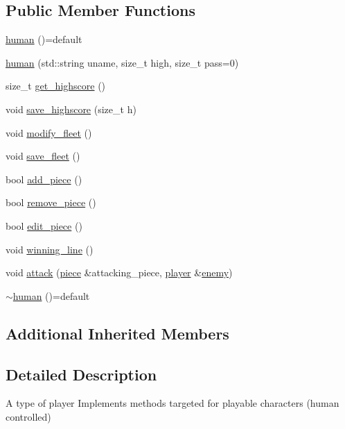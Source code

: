 \subsection*{Public Member Functions}
\begin{DoxyCompactItemize}
\item 
\hyperlink{classbattle__ship_1_1human_abf9adbf70e2b5cec288c900f337f4c56}{human} ()=default
\item 
\hyperlink{classbattle__ship_1_1human_a9d8abd36c22aeddad8c57a5b1e74b4cd}{human} (std\+::string uname, size\+\_\+t high, size\+\_\+t pass=0)
\item 
size\+\_\+t \hyperlink{classbattle__ship_1_1human_ac3529c252376938ce6b62ac40f8df3b3}{get\+\_\+highscore} ()
\item 
void \hyperlink{classbattle__ship_1_1human_a5b7e6cad4d1f187907a205b767a2fd7d}{save\+\_\+highscore} (size\+\_\+t h)
\item 
void \hyperlink{classbattle__ship_1_1human_ab6e8f18828d7671bbc7645f38369d370}{modify\+\_\+fleet} ()
\item 
void \hyperlink{classbattle__ship_1_1human_a3d14bca9009f7cfb8d4501d428524416}{save\+\_\+fleet} ()
\item 
bool \hyperlink{classbattle__ship_1_1human_adaea883b2eb5fa5932a9d7239c90bfd6}{add\+\_\+piece} ()
\item 
bool \hyperlink{classbattle__ship_1_1human_a2638497165f4a593b3b597a785fc3ee0}{remove\+\_\+piece} ()
\item 
bool \hyperlink{classbattle__ship_1_1human_a8f0addc975b597a92d4c82849c2fff5d}{edit\+\_\+piece} ()
\item 
void \hyperlink{classbattle__ship_1_1human_a583d0a9dd05c16f700d0d1825916faa3}{winning\+\_\+line} ()
\item 
void \hyperlink{classbattle__ship_1_1human_ad89701f0c4dd688c564b14a015059386}{attack} (\hyperlink{classbattle__ship_1_1piece}{piece} \&attacking\+\_\+piece, \hyperlink{classbattle__ship_1_1player}{player} \&\hyperlink{classbattle__ship_1_1player_af01292346caaf209039b6490ae18d8aa}{enemy})
\item 
\hyperlink{classbattle__ship_1_1human_ad1c94c01291be1e1908301cffc41497d}{$\sim$human} ()=default
\end{DoxyCompactItemize}
\subsection*{Additional Inherited Members}


\subsection{Detailed Description}
A type of player Implements methods targeted for playable characters (human controlled) 

